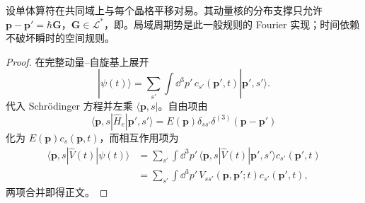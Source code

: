 \begin{proposition}[晶格平移不变算符的动量选择规则]
设单体算符在共同域上与每个晶格平移对易。其动量核的分布支撑只允许 $\mathbf p-\mathbf p\prime=\hbar\mathbf G$，$\mathbf G\in\mathcal L^*$，即。局域周期势是此一般规则的 Fourier 实现；时间依赖不破坏瞬时的空间规则。
\end{proposition}
\begin{proof}
在完整动量--自旋基上展开
\begin{equation*}
|\psi(t)\rangle=\sum_{s'}\int\dd^3 p'\,
c_{s'}(\mathbf p',t)|\mathbf p',s'\rangle .
\end{equation*}
代入 Schr\"odinger 方程并左乘 $\langle\mathbf p,s|$。自由项由
\begin{equation*}
\langle\mathbf p,s|\hat H_e|\mathbf p',s'\rangle
=E(\mathbf p)\delta_{ss'}\delta^{(3)}(\mathbf p-\mathbf p')
\end{equation*}
化为 $E(\mathbf p)c_s(\mathbf p,t)$，而相互作用项为
\begin{align*}
\langle\mathbf p,s|\hat V(t)|\psi(t)\rangle
&=\sum_{s'}\int\dd^3 p'\,
\langle\mathbf p,s|\hat V(t)|\mathbf p',s'\rangle c_{s'}(\mathbf p',t)\\
&=\sum_{s'}\int\dd^3 p'\,
V_{ss'}(\mathbf p,\mathbf p';t)c_{s'}(\mathbf p',t),
\end{align*}
两项合并即得正文。


\end{proof}

